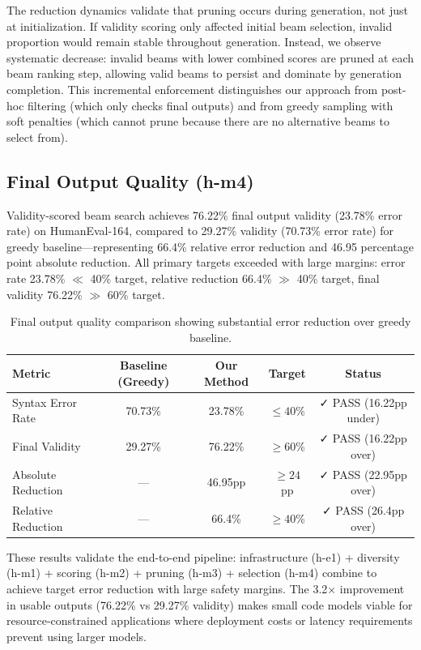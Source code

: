 The reduction dynamics validate that pruning occurs during generation, not just at initialization. If validity scoring only affected initial beam selection, invalid proportion would remain stable throughout generation. Instead, we observe systematic decrease: invalid beams with lower combined scores are pruned at each beam ranking step, allowing valid beams to persist and dominate by generation completion. This incremental enforcement distinguishes our approach from post-hoc filtering (which only checks final outputs) and from greedy sampling with soft penalties (which cannot prune because there are no alternative beams to select from).

\subsection{Final Output Quality (h-m4)}

Validity-scored beam search achieves 76.22\% final output validity (23.78\% error rate) on HumanEval-164, compared to 29.27\% validity (70.73\% error rate) for greedy baseline---representing 66.4\% relative error reduction and 46.95 percentage point absolute reduction. All primary targets exceeded with large margins: error rate 23.78\% $\ll$ 40\% target, relative reduction 66.4\% $\gg$ 40\% target, final validity 76.22\% $\gg$ 60\% target.

\begin{table}[h]
\centering
\caption{Final output quality comparison showing substantial error reduction over greedy baseline.}
\label{tab:final-output}
\begin{tabular}{lcccc}
\toprule
Metric & Baseline (Greedy) & Our Method & Target & Status \\
\midrule
Syntax Error Rate & 70.73\% & 23.78\% & $\leq 40$\% & ✓ PASS (16.22pp under) \\
Final Validity & 29.27\% & 76.22\% & $\geq 60$\% & ✓ PASS (16.22pp over) \\
Absolute Reduction & --- & 46.95pp & $\geq 24$pp & ✓ PASS (22.95pp over) \\
Relative Reduction & --- & 66.4\% & $\geq 40$\% & ✓ PASS (26.4pp over) \\
\bottomrule
\end{tabular}
\end{table}

These results validate the end-to-end pipeline: infrastructure (h-e1) + diversity (h-m1) + scoring (h-m2) + pruning (h-m3) + selection (h-m4) combine to achieve target error reduction with large safety margins. The 3.2$\times$ improvement in usable outputs (76.22\% vs 29.27\% validity) makes small code models viable for resource-constrained applications where deployment costs or latency requirements prevent using larger models.

